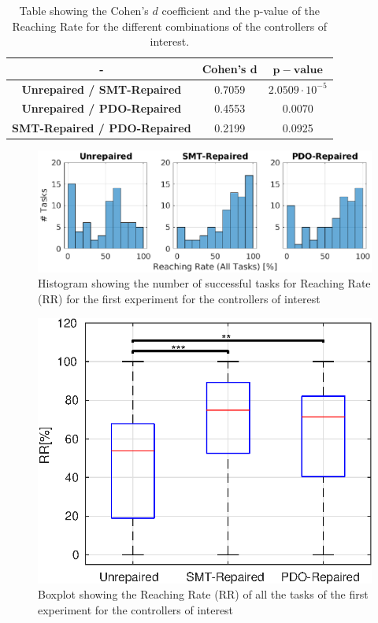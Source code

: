 \begin{table}[ht]
    \centering
    \begin{tabular}{|c|c|c|}
        \hline
        - & \textbf{Cohen's} $\mathbf{d}$ & $\mathbf{p-value}$ \\
        \hline
        \textbf{Unrepaired / SMT-Repaired} & 0.7059 & $2.0509 \cdot 10^{-5}$ \\
        \textbf{Unrepaired / PDO-Repaired} & 0.4553 & 0.0070\\
        \textbf{SMT-Repaired / PDO-Repaired} & 0.2199 & 0.0925 \\
        \hline
    \end{tabular}
    \caption{Table showing the Cohen's $d$ coefficient and the p-value of the Reaching Rate for the different combinations of the controllers of interest.}
    \label{tab:RR-all-first-cohen-p}
\end{table}
\begin{figure}[ht]
    \centering
    \includegraphics[width=\textwidth]{Images/first-experiment/exp0_RR_all_hist.eps}
    \caption{Histogram showing the number of successful tasks for Reaching Rate (RR) for the first experiment for the controllers of interest}
    \label{fig:hist-RR-all-first}
\end{figure}
\begin{figure}[ht]
    \centering
    \includegraphics[width=\textwidth]{Images/first-experiment/exp0_RR_all_box.eps}
    \caption{Boxplot showing the Reaching Rate (RR) of all the tasks of the first experiment for the controllers of interest}
    \label{fig:box-RR-all-first}
\end{figure}